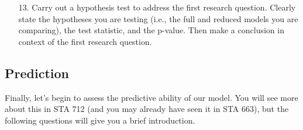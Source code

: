 \documentclass[11pt]{article}
\begin{document}
\begin{enumerate}
\item[13.] Carry out a hypothesis test to address the first research question. Clearly state the hypotheses you are testing (i.e., the full and reduced models you are comparing), the test statistic, and the p-value. Then make a conclusion in context of the first research question.
\end{enumerate}

\subsection*{Prediction}

Finally, let's begin to assess the predictive ability of our model. You will see more about this in STA 712 (and you may already have seen it in STA 663), but the following questions will give you a brief introduction. 
\end{document}
